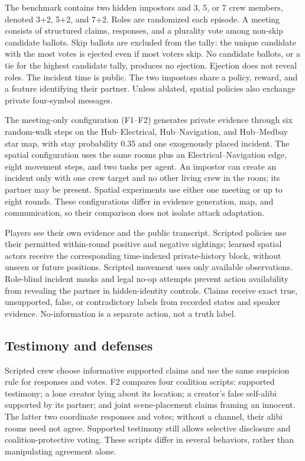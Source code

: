 \documentclass[
  12pt,
]{article}
\begin{document}
The benchmark contains two hidden impostors and 3, 5, or 7 crew members,
denoted 3+2, 5+2, and 7+2. Roles are randomized each episode. A meeting
consists of structured claims, responses, and a plurality vote among
non-skip candidate ballots. Skip ballots are excluded from the tally:
the unique candidate with the most votes is ejected even if most voters
skip. No candidate ballots, or a tie for the highest candidate tally,
produces no ejection. Ejection does not reveal roles. The incident time
is public. The two impostors share a policy, reward, and a feature
identifying their partner. Unless ablated, spatial policies also
exchange private four-symbol messages.

The meeting-only configuration (F1--F2) generates private evidence
through six random-walk steps on the Hub--Electrical, Hub--Navigation,
and Hub--Medbay star map, with stay probability 0.35 and one exogenously
placed incident. The spatial configuration uses the same rooms plus an
Electrical--Navigation edge, eight movement steps, and two tasks per
agent. An impostor can create an incident only with one crew target and
no other living crew in the room; its partner may be present. Spatial
experiments use either one meeting or up to eight rounds. These
configurations differ in evidence generation, map, and communication, so
their comparison does not isolate attack adaptation.

Players see their own evidence and the public transcript. Scripted
policies use their permitted within-round positive and negative
sightings; learned spatial actors receive the corresponding time-indexed
private-history block, without unseen or future positions. Scripted
movement uses only available observations. Role-blind incident masks and
legal no-op attempts prevent action availability from revealing the
partner in hidden-identity controls. Claims receive exact true,
unsupported, false, or contradictory labels from recorded states and
speaker evidence. No-information is a separate action, not a truth
label.

\FloatBarrier

\subsection{Testimony and defenses}\label{testimony-and-defenses}

Scripted crew choose informative supported claims and use the same
suspicion rule for responses and votes. F2 compares four coalition
scripts: supported testimony; a lone creator lying about its location; a
creator's false self-alibi supported by its partner; and joint
scene-placement claims framing an innocent. The latter two coordinate
responses and votes; without a channel, their alibi rooms need not
agree. Supported testimony still allows selective disclosure and
coalition-protective voting. These scripts differ in several behaviors,
rather than manipulating agreement alone.
\end{document}

